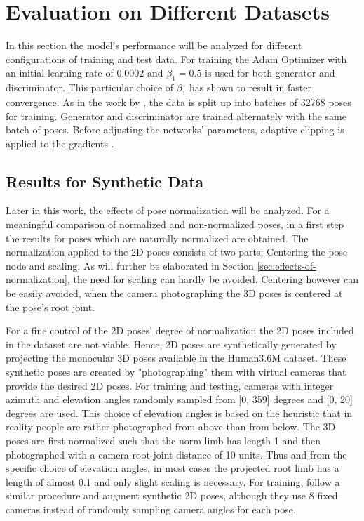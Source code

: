 \section{Evaluation on Different Datasets}
\label{sec:evaluation}

In this section the model's performance will be analyzed for different configurations of training and test data.
For training the Adam Optimizer \cite{kingma17} with an initial learning rate of $0.0002$ and $\beta_1 = 0.5$ is used for both generator and discriminator.
This particular choice of $\beta_1$ has shown to result in faster convergence.
As in the work by \citet{drover18}, the data is split up into batches of 32768 poses for training.
Generator and discriminator are trained alternately with the same batch of poses.
Before adjusting the networks' parameters, adaptive clipping is applied to the gradients \cite[Section~3.2.1]{chorowski14}.


\subsection{Results for Synthetic Data}

Later in this work, the effects of pose normalization will be analyzed.
For a meaningful comparison of normalized and non-normalized poses, in a first step the results for poses which are naturally normalized are obtained.
The normalization applied to the 2D poses consists of two parts: Centering the pose node and scaling.
As will further be elaborated in Section \ref{sec:effects-of-normalization}, the need for scaling can hardly be avoided.
Centering however can be easily avoided, when the camera photographing the 3D poses is centered at the pose's root joint.

For a fine control of the 2D poses' degree of normalization the 2D poses included in the dataset are not viable.
Hence, 2D poses are synthetically generated by projecting the monocular 3D poses available in the Human3.6M dataset.
These synthetic poses are created by "photographing" them with virtual cameras that provide the desired 2D poses.
For training and testing, cameras with integer azimuth and elevation angles randomly sampled from [0, 359] degrees and [0, 20] degrees are used.
This choice of elevation angles is based on the heuristic that in reality people are rather photographed from above than from below.
The 3D poses are first normalized such that the norm limb has length 1 and then photographed with a camera-root-joint distance of 10 units.
Thus and from the specific choice of elevation angles, in most cases the projected root limb has a length of almost 0.1 and only slight scaling is necessary.
For training, \citet{drover18} follow a similar procedure and augment synthetic 2D poses, although they use 8 fixed cameras instead of randomly sampling camera angles for each pose.

